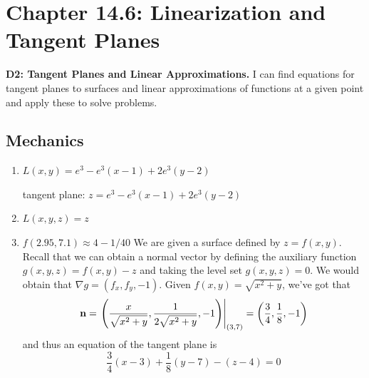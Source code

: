 \fancyhead[R]{\daytwelve}

\section*{\centering Chapter 14.6: Linearization and Tangent Planes}

\textbf{D2: Tangent Planes and Linear Approximations.} I can find equations for tangent planes to surfaces and linear approximations of functions at a given point and apply these to solve problems.

\subsection*{Mechanics}
\begin{enumerate}	
    \item %
    {%
    $L(x,y)=e^3-e^3(x-1)+2e^3(y-2)$
    
    tangent plane: $z=e^3-e^3(x-1)+2e^3(y-2)$
    }
    {%
    }
     
	
	\item {}
    {%
    $L(x,y,z)=z$
    }
    {%
    } 
	\item {}
    {%
    $f(2.95, 7.1)\approx 4-1/40$
    }
    {We are given a surface defined by $z = f(x,y)$. Recall that we can obtain a normal vector by defining the auxiliary function $g(x,y,z) = f(x,y)-z$ and taking the level set $g(x,y,z) = 0$. We would obtain that $\nabla g = (f_x,f_y, -1)$. Given $f(x,y) = \sqrt{x^2+y}$, we've got that 
\begin{equation*}
    \mathbf{n} = \left.\left(\frac{x}{\sqrt{x^2+y}},\frac{1}{2\sqrt{x^2+y}},-1\right)\right|_{(3,7)} = \left(\frac{3}{4},\frac{1}{8},-1\right)
\end{equation*}
and thus an equation of the tangent plane is 
\begin{equation*}
   \frac{3}{4}(x-3)+\frac{1}{8}(y-7)-(z-4)=0
\end{equation*}
}
\end{enumerate}
